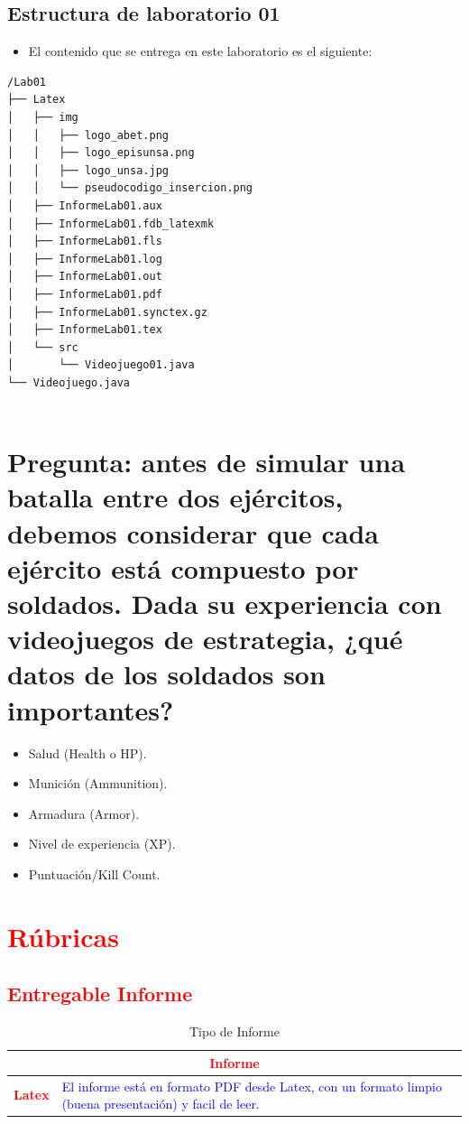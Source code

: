 \documentclass{article}
\begin{document}
	\subsection{Estructura de laboratorio 01}
	\begin{itemize}	
		\item El contenido que se entrega en este laboratorio es el siguiente:
	\end{itemize}
	
\begin{lstlisting}[style=ascii-tree]
/Lab01
├── Latex
│   ├── img
│   │   ├── logo_abet.png
│   │   ├── logo_episunsa.png
│   │   ├── logo_unsa.jpg
│   │   └── pseudocodigo_insercion.png
│   ├── InformeLab01.aux
│   ├── InformeLab01.fdb_latexmk
│   ├── InformeLab01.fls
│   ├── InformeLab01.log
│   ├── InformeLab01.out
│   ├── InformeLab01.pdf
│   ├── InformeLab01.synctex.gz
│   ├── InformeLab01.tex
│   └── src
│       └── Videojuego01.java
└── Videojuego.java
	
\end{lstlisting}    

\section{Pregunta: antes de simular una batalla entre dos ejércitos, debemos considerar que cada ejército está
compuesto por soldados. Dada su experiencia con videojuegos de estrategia, ¿qué datos de los soldados son
importantes?}
	\begin{itemize}
		\item Salud (Health o HP).
		\item Munición (Ammunition).
		\item Armadura (Armor).
		\item Nivel de experiencia (XP).
		\item Puntuación/Kill Count. 
	\end{itemize}		

	\section{\textcolor{red}{Rúbricas}}
	
	\subsection{\textcolor{red}{Entregable Informe}}
	\begin{table}[H]
		\caption{Tipo de Informe}
		\setlength{\tabcolsep}{0.5em} %
		{\renewcommand{\arraystretch}{1.5}%
		\begin{tabular}{|p{3cm}|p{12cm}|}
			\hline
			\multicolumn{2}{|c|}{\textbf{\textcolor{red}{Informe}}}  \\
			\hline 
			\textbf{\textcolor{red}{Latex}} & \textcolor{blue}{El informe está en formato PDF desde Latex,  con un formato limpio (buena presentación) y facil de leer.}   \\ 
			\hline 
			
			
		\end{tabular}
	}
	\end{table}
	
\end{document}
